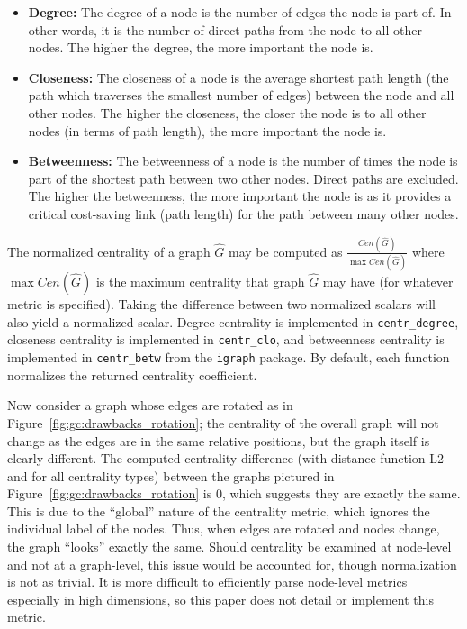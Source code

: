 \tablespacing
\begin{itemize}
	\item \textbf{Degree:} The degree of a node is the number of edges the node 
	is part of. In other words, it is the number of direct paths from the node 
	to all other nodes. The higher the degree, the more important the node 
	is.
	\item \textbf{Closeness:} The closeness of a node is the average 
	shortest path length (the path which traverses the smallest number of 
	edges) between the node and all other nodes. The higher the closeness, 
	the closer the node is to all other nodes (in terms of path length), the 
	more important the node is.
	\item \textbf{Betweenness:} The betweenness of a node is the number of 
	times the node is part of the shortest path between two other nodes. Direct 
	paths are excluded. The higher the betweenness, the more important the node 
	is as it provides a critical cost-saving link (path length) for the path 
	between many other nodes. 
\end{itemize}
\bodyspacing

The normalized centrality of a graph $\hat{G}$ may be computed as 	
$\frac{Cen(\hat{G})}{\max Cen(\hat{G})}$ where $\max Cen(\hat{G})$ is the 
maximum centrality that graph $\hat{G}$ may have (for whatever metric is 
specified). Taking the difference between two normalized scalars will also 
yield a normalized scalar.
Degree centrality is implemented in \texttt{centr\_degree}, 
closeness centrality is implemented in \texttt{centr\_clo}, and betweenness 
centrality is implemented in \texttt{centr\_betw} from the \texttt{igraph} 
package. By default, each function normalizes the returned centrality 
coefficient.

Now consider a graph whose edges are rotated as in 
Figure~\ref{fig:gc:drawbacks_rotation}; the centrality of the overall graph 
will not change as the edges are in the same relative positions, but the graph 
itself is clearly different. The computed centrality difference (with distance 
function L2 and for all centrality types) between the graphs pictured in 
Figure~\ref{fig:gc:drawbacks_rotation} is 0, which suggests they are exactly 
the same. This is due to the ``global'' nature of the centrality metric, which 
ignores the individual label of the nodes. Thus, when edges are rotated and 
nodes change, the graph ``looks'' exactly the same.
Should centrality be examined at node-level and not at a graph-level, 
this issue would be accounted for, though normalization is not as trivial. It 
is more difficult to efficiently parse node-level metrics 
especially in high dimensions, so this paper does not detail or implement this 
metric.

